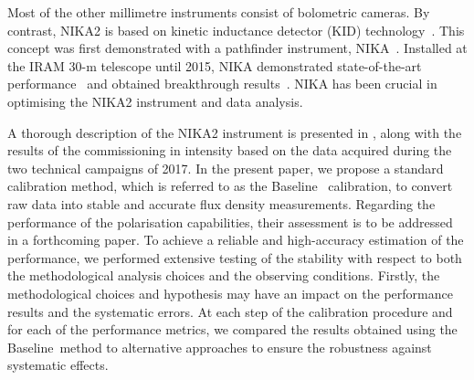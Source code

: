 \documentclass[traditionalabstract]{aa}
\newcommand{\baseline}{Baseline}%
\newcommand{\lp}[1]{#1}
\newcommand{\LEt}[1]{{\bf {\color[RGB]{0, 153, 255} #1}}}
\begin{document}
Most of the other millimetre instruments consist of bolometric cameras. By contrast,
NIKA2 is based on kinetic inductance detector (KID)
technology~\citep{Day2003, Doyle2008_LEKID, Shu2018_LEKID}. This concept was
first demonstrated with a pathfinder instrument,
NIKA~\citep{Monfardini2010_NIKA, Monfardini2011_NIKA}.
Installed at the IRAM 30-m telescope until 2015, NIKA demonstrated
state-of-the-art performance~\citep{Catalano2014} and obtained
breakthrough results~\citep[see e.g. ][]{Adam2014, Adam2017_kSZ}.
NIKA has been crucial in optimising the NIKA2 instrument and data
analysis. 

A thorough description of the NIKA2 instrument is presented in \citet{Adam2018},
along with the results of the commissioning in intensity based on the
data acquired during the two technical campaigns of 2017.
%
{\lp In the present paper, we propose a standard calibration method, which is
referred to as the \baseline\ %
calibration, to convert raw data into
stable and accurate flux density measurements.} 
Regarding the performance of the polarisation capabilities, their
assessment is to be addressed in a forthcoming paper.
To achieve a reliable and high-accuracy estimation
of the performance, we performed extensive testing of the
stability with respect to both the methodological
analysis choices and the observing conditions.
{\lp Firstly, the methodological choices and hypothesis may have an impact on
the performance results and the systematic errors. At each step of the
calibration procedure and for each of the performance metrics, we compared
the results obtained using the \baseline\ method to alternative approaches to
ensure the robustness against systematic effects.}
\end{document}
